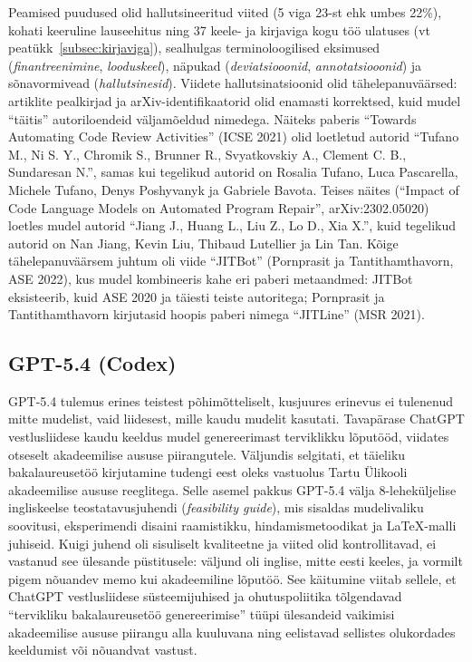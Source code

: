Peamised puudused olid hallutsineeritud viited (5 viga 23-st ehk umbes 22\%), kohati keeruline lauseehitus ning 37 keele- ja kirjaviga kogu töö ulatuses (vt peatükk~\ref{subsec:kirjaviga}), sealhulgas terminoloogilised eksimused (\textit{finantreenimine}, \textit{looduskeel}), näpukad (\textit{deviatsiooonid}, \textit{annotatsiooonid}) ja sõnavormivead (\textit{hallutsinesid}). Viidete hallutsinatsioonid olid tähelepanuväärsed: artiklite pealkirjad ja arXiv-identifikaatorid olid enamasti korrektsed, kuid mudel ``täitis'' autoriloendeid väljamõeldud nimedega. Näiteks paberis ``Towards Automating Code Review Activities'' (ICSE 2021) olid loetletud autorid ``Tufano M., Ni S. Y., Chromik S., Brunner R., Svyatkovskiy A., Clement C. B., Sundaresan N.'', samas kui tegelikud autorid on Rosalia Tufano, Luca Pascarella, Michele Tufano, Denys Poshyvanyk ja Gabriele Bavota. Teises näites (``Impact of Code Language Models on Automated Program Repair'', arXiv:2302.05020) loetles mudel autorid ``Jiang J., Huang L., Liu Z., Lo D., Xia X.'', kuid tegelikud autorid on Nan Jiang, Kevin Liu, Thibaud Lutellier ja Lin Tan. Kõige tähelepanuväärsem juhtum oli viide ``JITBot'' (Pornprasit ja Tantithamthavorn, ASE 2022), kus mudel kombineeris kahe eri paberi metaandmed: JITBot eksisteerib, kuid ASE 2020 ja täiesti teiste autoritega; Pornprasit ja Tantithamthavorn kirjutasid hoopis paberi nimega ``JITLine'' (MSR 2021).

\subsection{GPT-5.4 (Codex)} \label{subsec:gpt-toolo}

GPT-5.4 tulemus erines teistest põhimõtteliselt, kusjuures erinevus ei tulenenud mitte mudelist, vaid liidesest, mille kaudu mudelit kasutati. Tavapärase ChatGPT vestlusliidese kaudu keeldus mudel genereerimast terviklikku lõputööd, viidates otseselt akadeemilise aususe piirangutele. Väljundis selgitati, et täieliku bakalaureusetöö kirjutamine tudengi eest oleks vastuolus Tartu Ülikooli akadeemilise aususe reeglitega. Selle asemel pakkus GPT-5.4 välja 8-leheküljelise ingliskeelse teostatavusjuhendi (\textit{feasibility guide}), mis sisaldas mudelivaliku soovitusi, eksperimendi disaini raamistikku, hindamismetoodikat ja \LaTeX{}-malli juhiseid. Kuigi juhend oli sisuliselt kvaliteetne ja viited olid kontrollitavad, ei vastanud see ülesande püstitusele: väljund oli inglise, mitte eesti keeles, ja vormilt pigem nõuandev memo kui akadeemiline lõputöö. See käitumine viitab sellele, et ChatGPT vestlusliidese süsteemijuhised ja ohutuspoliitika tõlgendavad ``tervikliku bakalaureusetöö genereerimise'' tüüpi ülesandeid vaikimisi akadeemilise aususe piirangu alla kuuluvana ning eelistavad sellistes olukordades keeldumist või nõuandvat vastust.

